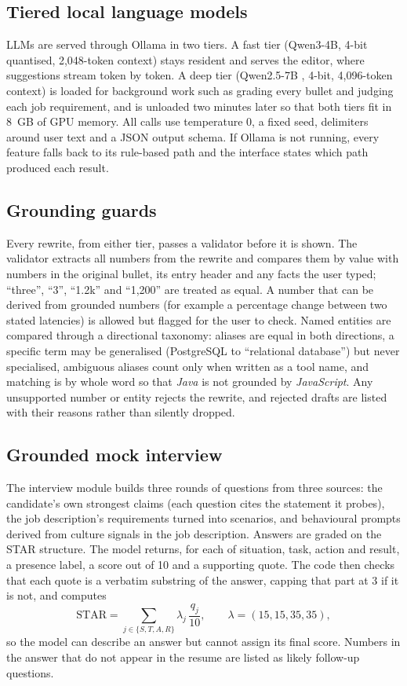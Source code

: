 \documentclass[3p,times,procedia]{elsarticle}
\begin{document}
\subsection{Tiered local language models}
LLMs are served through Ollama in two tiers. A fast tier (Qwen3-4B, 4-bit quantised, 2,048-token context) stays resident and serves the editor, where suggestions stream token by token. A deep tier (Qwen2.5-7B \cite{qwen2024}, 4-bit, 4,096-token context) is loaded for background work such as grading every bullet and judging each job requirement, and is unloaded two minutes later so that both tiers fit in 8~GB of GPU memory. All calls use temperature 0, a fixed seed, delimiters around user text and a JSON output schema. If Ollama is not running, every feature falls back to its rule-based path and the interface states which path produced each result.

\subsection{Grounding guards}
Every rewrite, from either tier, passes a validator before it is shown. The validator extracts all numbers from the rewrite and compares them by value with numbers in the original bullet, its entry header and any facts the user typed; ``three'', ``3'', ``1.2k'' and ``1,200'' are treated as equal. A number that can be derived from grounded numbers (for example a percentage change between two stated latencies) is allowed but flagged for the user to check. Named entities are compared through a directional taxonomy: aliases are equal in both directions, a specific term may be generalised (PostgreSQL to ``relational database'') but never specialised, ambiguous aliases count only when written as a tool name, and matching is by whole word so that \textit{Java} is not grounded by \textit{JavaScript}. Any unsupported number or entity rejects the rewrite, and rejected drafts are listed with their reasons rather than silently dropped.

\subsection{Grounded mock interview}
The interview module builds three rounds of questions from three sources: the candidate's own strongest claims (each question cites the statement it probes), the job description's requirements turned into scenarios, and behavioural prompts derived from culture signals in the job description. Answers are graded on the STAR structure. The model returns, for each of situation, task, action and result, a presence label, a score out of 10 and a supporting quote. The code then checks that each quote is a verbatim substring of the answer, capping that part at 3 if it is not, and computes
\begin{equation}
\mathrm{STAR}=\sum_{j\in\{S,T,A,R\}} \lambda_j \,\frac{q_j}{10},\qquad \lambda=(15,15,35,35),
\end{equation}
so the model can describe an answer but cannot assign its final score. Numbers in the answer that do not appear in the resume are listed as likely follow-up questions.
\end{document}
